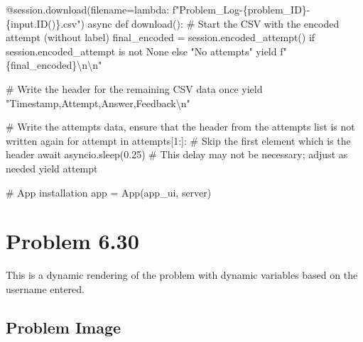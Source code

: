 \documentclass[
  letterpaper,
  DIV=11,
  numbers=noendperiod]{scrreprt}
\newenvironment{Shaded}{\begin{snugshade}}{\end{snugshade}}
\newcommand{\NormalTok}[1]{\textcolor[rgb]{0.00,0.23,0.31}{#1}}
\begin{document}
\begin{Shaded}
\begin{Highlighting}[]
\NormalTok{    @session.download(filename=lambda: f"Problem\_Log{-}\{problem\_ID\}{-}\{input.ID()\}.csv")}
\NormalTok{    async def download():}
\NormalTok{        \# Start the CSV with the encoded attempt (without label)}
\NormalTok{        final\_encoded = session.encoded\_attempt() if session.encoded\_attempt is not None else "No attempts"}
\NormalTok{        yield f"\{final\_encoded\}\textbackslash{}n\textbackslash{}n"}
        
\NormalTok{        \# Write the header for the remaining CSV data once}
\NormalTok{        yield "Timestamp,Attempt,Answer,Feedback\textbackslash{}n"}
        
\NormalTok{        \# Write the attempts data, ensure that the header from the attempts list is not written again}
\NormalTok{        for attempt in attempts[1:]:  \# Skip the first element which is the header}
\NormalTok{            await asyncio.sleep(0.25)  \# This delay may not be necessary; adjust as needed}
\NormalTok{            yield attempt}


\NormalTok{\# App installation}
\NormalTok{app = App(app\_ui, server)}
\end{Highlighting}
\end{Shaded}

\chapter*{Problem 6.30}\label{problem-6.30}


This is a dynamic rendering of the problem with dynamic variables based
on the username entered.

\section*{Problem Image}\label{problem-image-71}

\end{document}
